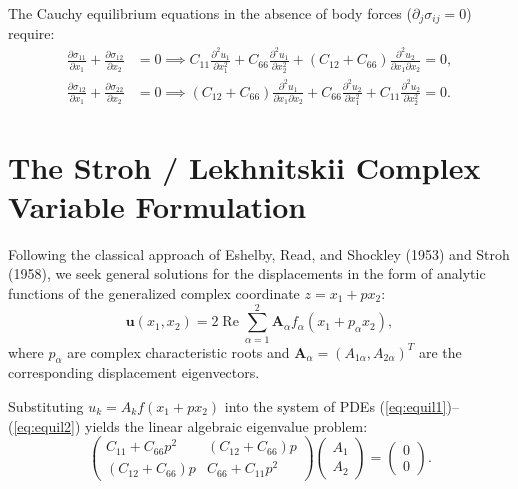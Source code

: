 \documentclass[11pt,a4paper]{article}
\begin{document}
The Cauchy equilibrium equations in the absence of body forces ($\partial_j \sigma_{ij} = 0$) require:
\begin{align}
\frac{\partial \sigma_{11}}{\partial x_1} + \frac{\partial \sigma_{12}}{\partial x_2} &= 0 \implies C_{11} \frac{\partial^2 u_1}{\partial x_1^2} + C_{66} \frac{\partial^2 u_1}{\partial x_2^2} + (C_{12} + C_{66}) \frac{\partial^2 u_2}{\partial x_1 \partial x_2} = 0, \label{eq:equil1} \\
\frac{\partial \sigma_{12}}{\partial x_1} + \frac{\partial \sigma_{22}}{\partial x_2} &= 0 \implies (C_{12} + C_{66}) \frac{\partial^2 u_1}{\partial x_1 \partial x_2} + C_{66} \frac{\partial^2 u_2}{\partial x_1^2} + C_{11} \frac{\partial^2 u_2}{\partial x_2^2} = 0. \label{eq:equil2}
\end{align}

\section{The Stroh / Lekhnitskii Complex Variable Formulation}

Following the classical approach of Eshelby, Read, and Shockley (1953) and Stroh (1958), we seek general solutions for the displacements in the form of analytic functions of the generalized complex coordinate $z = x_1 + p x_2$:
\begin{equation}
\bm{u}(x_1, x_2) = 2 \operatorname{Re} \sum_{\alpha=1}^2 \bm{A}_\alpha f_\alpha(x_1 + p_\alpha x_2),
\end{equation}
where $p_\alpha$ are complex characteristic roots and $\bm{A}_\alpha = (A_{1\alpha}, A_{2\alpha})^T$ are the corresponding displacement eigenvectors.

Substituting $u_k = A_k f(x_1 + p x_2)$ into the system of PDEs (\ref{eq:equil1})--(\ref{eq:equil2}) yields the linear algebraic eigenvalue problem:
\begin{equation}
\begin{pmatrix}
C_{11} + C_{66} p^2 & (C_{12} + C_{66}) p \\
(C_{12} + C_{66}) p & C_{66} + C_{11} p^2
\end{pmatrix}
\begin{pmatrix}
A_1 \\
A_2
\end{pmatrix}
=
\begin{pmatrix}
0 \\
0
\end{pmatrix}.
\end{equation}
\end{document}
